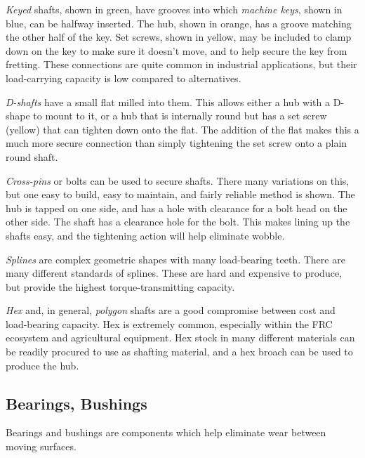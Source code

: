 	\begin{asparaenum}[a)]
		\item \textit{Keyed} shafts, shown in green, have grooves into which \textit{machine keys}, shown in blue, can be halfway inserted. The hub, shown in orange, has a groove matching the other half of the key. Set screws, shown in yellow, may be included to clamp down on the key to make sure it doesn't move, and to help secure the key from fretting. These connections are quite common in industrial applications, but their load-carrying capacity is low compared to alternatives.
		\item \textit{D-shafts} have a small flat milled into them. This allows either a hub with a D-shape to mount to it, or a hub that is internally round but has a set screw (yellow) that can tighten down onto the flat. The addition of the flat makes this a much more secure connection than simply tightening the set screw onto a plain round shaft.
		\item \textit{Cross-pins} or bolts can be used to secure shafts. There many variations on this, but one easy to build, easy to maintain, and fairly reliable method is shown. The hub is tapped on one side, and has a hole with clearance for a bolt head on the other side. The shaft has a clearance hole for the bolt. This makes lining up the shafts easy, and the tightening action will help eliminate wobble.
		\item \textit{Splines} are complex geometric shapes with many load-bearing teeth. There are many different standards of splines. These are hard and expensive to produce, but provide the highest torque-transmitting capacity.
		\item \textit{Hex} and, in general, \textit{polygon} shafts are a good compromise between cost and load-bearing capacity. Hex is extremely common, especially within the FRC ecosystem and agricultural equipment. Hex stock in many different materials can be readily procured to use as shafting material, and a hex broach can be used to produce the hub.
	\end{asparaenum}
	
\subsection{Bearings, Bushings}
	 
	Bearings and bushings are components which help eliminate wear between moving surfaces.

